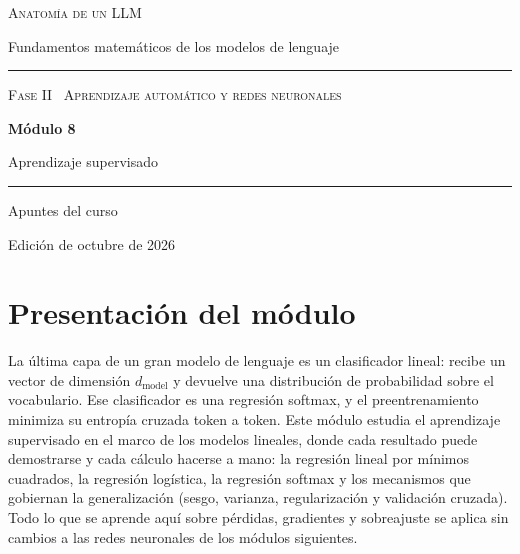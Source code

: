 \documentclass[11pt,a4paper,twoside,openany]{book}
\begin{document}
\frontmatter
\begin{titlepage}
\centering
\vspace*{2.5cm}
{\large\scshape Anatomía de un LLM}\par
\vspace{0.4cm}
{\normalsize Fundamentos matemáticos de los modelos de lenguaje}\par
\vspace{2.2cm}
\rule{\textwidth}{0.8pt}\par\vspace{0.5cm}
{\small\scshape Fase II \textperiodcentered\ Aprendizaje automático y redes neuronales}\par\vspace{0.3cm}
{\Huge\bfseries Módulo 8\par}\vspace{0.3cm}
{\LARGE Aprendizaje supervisado\par}
\vspace{0.5cm}\rule{\textwidth}{0.4pt}\par
\vspace{1.6cm}
{\large Apuntes del curso}\par
\vfill
{\small Edición de octubre de 2026}\par
\end{titlepage}

\chapter*{Presentación del módulo}

La última capa de un gran modelo de lenguaje es un clasificador lineal: recibe un vector de dimensión $d_{\text{model}}$ y devuelve una distribución de probabilidad sobre el vocabulario. Ese clasificador es una regresión softmax, y el preentrenamiento minimiza su entropía cruzada token a token. Este módulo estudia el aprendizaje supervisado en el marco de los modelos lineales, donde cada resultado puede demostrarse y cada cálculo hacerse a mano: la regresión lineal por mínimos cuadrados, la regresión logística, la regresión softmax y los mecanismos que gobiernan la generalización (sesgo, varianza, regularización y validación cruzada). Todo lo que se aprende aquí sobre pérdidas, gradientes y sobreajuste se aplica sin cambios a las redes neuronales de los módulos siguientes.
\end{document}
